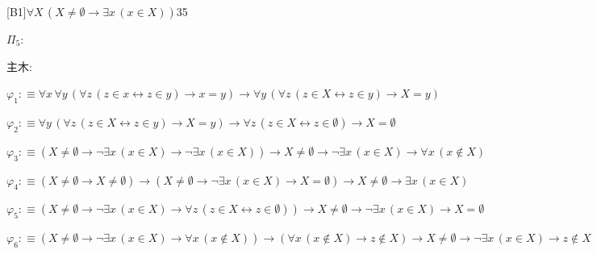 \begin{fullproof}{[B1]}{$\forall X\,(X \neq \emptyset \to \exists x\,(x \in X))$}{35}
\begin{ptree}
\end{ptree}
\noindent$\Pi_{5}$:
\begin{ptree}
\noLine
{}
\noLine
{}
\end{ptree}
\noindent 主木:
\begin{ptree}
\noLine
{}
\end{ptree}
\begin{abbrevlist}
\item $\varphi_{1} :\equiv \forall x\,\forall y\,(\forall z\,(z \in x \leftrightarrow z \in y) \to x = y) \to \forall y\,(\forall z\,(z \in X \leftrightarrow z \in y) \to X = y)$
\item $\varphi_{2} :\equiv \forall y\,(\forall z\,(z \in X \leftrightarrow z \in y) \to X = y) \to \forall z\,(z \in X \leftrightarrow z \in \emptyset) \to X = \emptyset$
\item $\varphi_{3} :\equiv (X \neq \emptyset \to \neg \exists x\,(x \in X) \to \neg \exists x\,(x \in X)) \to X \neq \emptyset \to \neg \exists x\,(x \in X) \to \forall x\,(x \notin X)$
\item $\varphi_{4} :\equiv (X \neq \emptyset \to X \neq \emptyset) \to (X \neq \emptyset \to \neg \exists x\,(x \in X) \to X = \emptyset) \to X \neq \emptyset \to \exists x\,(x \in X)$
\item $\varphi_{5} :\equiv (X \neq \emptyset \to \neg \exists x\,(x \in X) \to \forall z\,(z \in X \leftrightarrow z \in \emptyset)) \to X \neq \emptyset \to \neg \exists x\,(x \in X) \to X = \emptyset$
\item $\varphi_{6} :\equiv (X \neq \emptyset \to \neg \exists x\,(x \in X) \to \forall x\,(x \notin X)) \to (\forall x\,(x \notin X) \to z \notin X) \to X \neq \emptyset \to \neg \exists x\,(x \in X) \to z \notin X$

\end{abbrevlist}
\end{fullproof}
